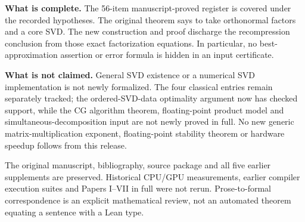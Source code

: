\textbf{What is complete.} The 56-item manuscript-proved register is covered under the recorded hypotheses. The original theorem says to take orthonormal factors and a core SVD. The new construction and proof discharge the recompression conclusion from those exact factorization equations. In particular, no best-approximation assertion or error formula is hidden in an input certificate.

\textbf{What is not claimed.} General SVD existence or a numerical SVD implementation is not newly formalized. The four classical entries remain separately tracked; the ordered-SVD-data optimality argument now has checked support, while the CG algorithm theorem, floating-point product model and simultaneous-decomposition input are not newly proved in full. No new generic matrix-multiplication exponent, floating-point stability theorem or hardware speedup follows from this release.

The original manuscript, bibliography, source package and all five earlier supplements are preserved. Historical CPU/GPU measurements, earlier compiler execution suites and Papers I--VII in full were not rerun. Prose-to-formal correspondence is an explicit mathematical review, not an automated theorem equating a sentence with a Lean type.
